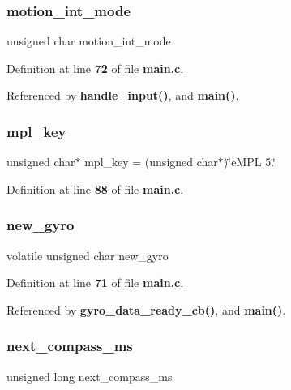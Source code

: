 \subsubsection{motion\+\_\+int\+\_\+mode}
{\footnotesize\ttfamily unsigned char motion\+\_\+int\+\_\+mode}



Definition at line \textbf{ 72} of file \textbf{ main.\+c}.



Referenced by \textbf{ handle\+\_\+input()}, and \textbf{ main()}.

\mbox{\label{group__eMPL_ga56d9a02ae0e768d49fd95fd014c47b07}} 
\subsubsection{mpl\+\_\+key}
{\footnotesize\ttfamily unsigned char$\ast$ mpl\+\_\+key = (unsigned char$\ast$)\char`\"{}e\+M\+PL 5.\char`\"{}}



Definition at line \textbf{ 88} of file \textbf{ main.\+c}.

\mbox{\label{group__eMPL_gacfce447bdb258e6fcf8e12e1b6e4481a}} 
\subsubsection{new\+\_\+gyro}
{\footnotesize\ttfamily volatile unsigned char new\+\_\+gyro}



Definition at line \textbf{ 71} of file \textbf{ main.\+c}.



Referenced by \textbf{ gyro\+\_\+data\+\_\+ready\+\_\+cb()}, and \textbf{ main()}.

\mbox{\label{group__eMPL_ga7e499f7a5d40750be7a5ba81761a56bd}} 
\subsubsection{next\+\_\+compass\+\_\+ms}
{\footnotesize\ttfamily unsigned long next\+\_\+compass\+\_\+ms}



